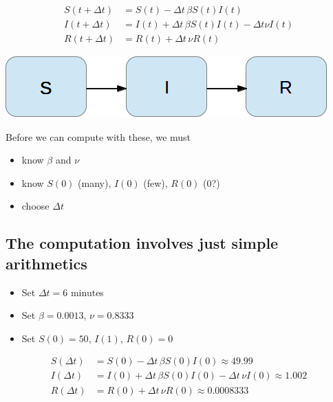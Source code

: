 \documentclass[%
twoside,                 %
final,                   %
10pt]{article}
\begin{document}
\begin{align}
S(t+\Delta t) &= S(t) - \Delta t\,\beta S(t)I(t)
\label{SIR1:S}\\
I(t+\Delta t) &= I(t) + \Delta t\,\beta S(t)I(t) -\Delta t\nu I(t)
\label{SIR1:I}\\
R(t+\Delta t) &= R(t) + \Delta t\,\nu R(t)
\label{SIR1:R}
\end{align}


\begin{center}  %
  \centerline{\includegraphics[width=0.7\linewidth]{fig/categories_SIR.png}}
\end{center}


Before we can compute with these, we must

\begin{itemize}
 \item know $\beta$ and $\nu$

 \item know $S(0)$ (many), $I(0)$ (few), $R(0)$ (0?)

 \item choose $\Delta t$
\end{itemize}

\noindent
\subsection{The computation involves just simple arithmetics}

\begin{itemize}
 \item Set $\Delta t=6$ minutes

 \item Set $\beta =0.0013$, $\nu =0.8333$

 \item Set $S(0)=50$, $I(1)$, $R(0)=0$
\end{itemize}

\noindent
\begin{align*}
S(\Delta t) &= S(0) - \Delta t\,\beta S(0)I(0)\approx 49.99\\
I(\Delta t) &= I(0) + \Delta t\,\beta S(0)I(0) -\Delta t\,\nu I(0)\approx 1.002\\
R(\Delta t) &= R(0) + \Delta t\,\nu R(0)\approx 0.0008333
\end{align*}
\end{document}
